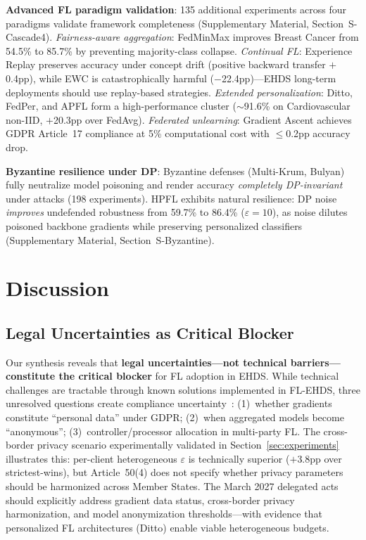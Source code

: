 \documentclass[conference,letterpaper]{IEEEtran}
\begin{document}
\textbf{Advanced FL paradigm validation}: 135 additional experiments across four paradigms validate framework completeness (Supplementary Material, Section~S-Cascade4). \textit{Fairness-aware aggregation}: FedMinMax improves Breast Cancer from 54.5\% to 85.7\% by preventing majority-class collapse. \textit{Continual FL}: Experience Replay preserves accuracy under concept drift (positive backward transfer $+$0.4pp), while EWC is catastrophically harmful ($-$22.4pp)---EHDS long-term deployments should use replay-based strategies. \textit{Extended personalization}: Ditto, FedPer, and APFL form a high-performance cluster ($\sim$91.6\% on Cardiovascular non-IID, $+$20.3pp over FedAvg). \textit{Federated unlearning}: Gradient Ascent achieves GDPR Article~17 compliance at 5\% computational cost with $\leq$0.2pp accuracy drop.

\textbf{Byzantine resilience under DP}: Byzantine defenses (Multi-Krum, Bulyan) fully neutralize model poisoning and render accuracy \textit{completely DP-invariant} under attacks (198 experiments). HPFL exhibits natural resilience: DP noise \textit{improves} undefended robustness from 59.7\% to 86.4\% ($\varepsilon{=}10$), as noise dilutes poisoned backbone gradients while preserving personalized classifiers (Supplementary Material, Section~S-Byzantine).

\section{Discussion}
\label{sec:discussion}

\subsection{Legal Uncertainties as Critical Blocker}

Our synthesis reveals that \textbf{legal uncertainties---not technical barriers---constitute the critical blocker} for FL adoption in EHDS. While technical challenges are tractable through known solutions implemented in FL-EHDS, three unresolved questions create compliance uncertainty~\cite{quinn2024gdpr}: (1)~whether gradients constitute ``personal data'' under GDPR; (2)~when aggregated models become ``anonymous''; (3)~controller/processor allocation in multi-party FL. The cross-border privacy scenario experimentally validated in Section~\ref{sec:experiments} illustrates this: per-client heterogeneous $\varepsilon$ is technically superior ($+$3.8pp over strictest-wins), but Article~50(4) does not specify whether privacy parameters should be harmonized across Member States. The March 2027 delegated acts should explicitly address gradient data status, cross-border privacy harmonization, and model anonymization thresholds---with evidence that personalized FL architectures (Ditto) enable viable heterogeneous budgets.
\end{document}

